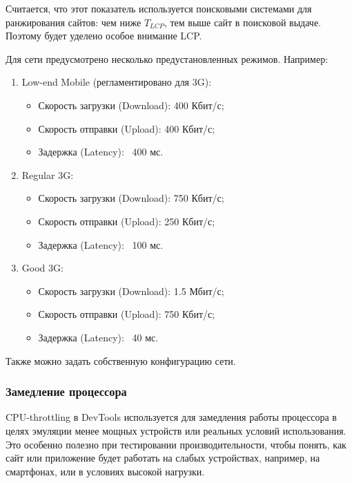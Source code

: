 \documentclass[12pt]{article}
\begin{document}
Считается, что этот показатель используется поисковыми системами для ранжирования сайтов:
чем ниже $T_{LCP}$, тем выше сайт в поисковой выдаче.
Поэтому будет уделено особое внимание LCP.

Для сети предусмотрено несколько предустановленных режимов. Например:

\begin{enumerate}
    \item Low-end Mobile (регламентировано для 3G):
          \begin{itemize}[label=-]
              \item Скорость загрузки (Download): 400 Кбит/с;
              \item Скорость отправки (Upload): 400 Кбит/с;
              \item Задержка (Latency): ~400 мс.
          \end{itemize}

    \item Regular 3G:
          \begin{itemize}[label=-]
              \item Скорость загрузки (Download): 750 Кбит/с;
              \item Скорость отправки (Upload): 250 Кбит/с;
              \item Задержка (Latency): ~100 мс.
          \end{itemize}

    \item Good 3G:
          \begin{itemize}[label=-]
              \item Скорость загрузки (Download): 1.5 Мбит/с;
              \item Скорость отправки (Upload): 750 Кбит/с;
              \item Задержка (Latency): ~40 мс.
          \end{itemize}
\end{enumerate}

Также можно задать собственную конфигурацию сети.

\subsubsection{Замедление процессора}

CPU-throttling в DevTools используется для замедления работы процессора
в целях эмуляции менее мощных устройств или реальных условий использования.
Это особенно полезно при тестировании производительности, чтобы понять,
как сайт или приложение будет работать на слабых устройствах,
например, на смартфонах, или в условиях высокой нагрузки.
\end{document}
